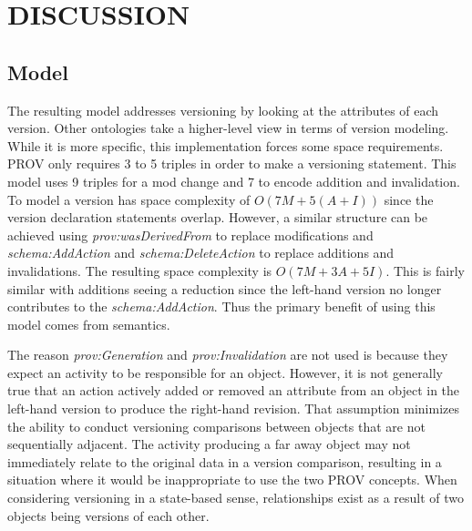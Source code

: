 
\chapter{DISCUSSION}

\section{Model}

The resulting model addresses versioning by looking at the attributes of each version.
Other ontologies take a higher-level view in terms of version modeling.
While it is more specific, this implementation forces some space requirements.
PROV only requires 3 to 5 triples in order to make a versioning statement.
This model uses 9 triples for a mod change and 7 to encode addition and invalidation.
To model a version has space complexity of \(O(7M+5(A+I))\) since the version declaration statements overlap.
However, a similar structure can be achieved using \textit{prov:wasDerivedFrom} to replace modifications and \textit{schema:AddAction} and \textit{schema:DeleteAction} to replace additions and invalidations.
The resulting space complexity is \(O(7M+3A+5I)\).
This is fairly similar with additions seeing a reduction since the left-hand version no longer contributes to the \textit{schema:AddAction}.
Thus the primary benefit of using this model comes from semantics.

The reason \textit{prov:Generation} and \textit{prov:Invalidation} are not used is because they expect an activity to be responsible for an object.
However, it is not generally true that an action actively added or removed an attribute from an object in the left-hand version to produce the right-hand revision.
That assumption minimizes the ability to conduct versioning comparisons between objects that are not sequentially adjacent.
The activity producing a far away object may not immediately relate to the original data in a version comparison, resulting in a situation where it would be inappropriate to use the two PROV concepts.
When considering versioning in a state-based sense, relationships exist as a result of two objects being versions of each other.

